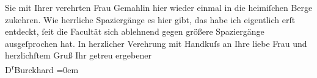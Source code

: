 \begin{ledgroupsized}[t]{13cm}
                    Sie mit Ihrer verehrten Frau Gemahlin hier wieder einmal in die heimiſchen Berge zukehren. Wie
                    herrliche Spaziergänge es hier gibt, das habe ich eigentlich erſt entdeckt, ſeit
                    die Facultät sich ablehnend gegen größere Spaziergänge ausgeſprochen hat.\pend
           \pstart
           {\pb}In herzlicher Verehrung mit Handkuſs
                    an Ihre liebe Frau und
                    herzlichſtem Gruß\pend
           \pstart
           Ihr getreu ergebener{\\[\baselineskip]}\spacefill\mbox{D\textsuperscript{r}Burckhard}\pend
           \leftskip=0em{}          \endnumbering{}\end{ledgroupsized}  \newcommand{\dateiname}{L01783}\newcommand{\titel}{Max Burckhard an Arthur Schnitzler, 14. 7. 1908}\newcommand{\editorInnen}{Martin Anton Müller und Gerd-Hermann Susen}
      